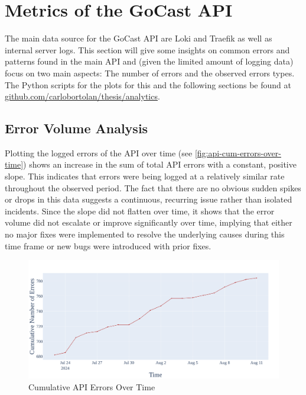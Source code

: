 \section{Metrics of the GoCast API}

The main data source for the GoCast \ac{API} are Loki and Traefik as well as internal server logs. This section will give some insights on common errors and patterns found in the main \ac{API} and (given the limited amount of logging data) focus on two main aspects: The number of errors and the observed errors types. The Python scripts for the plots for this and the following sections be found at \href{https://github.com/carlobortolan/thesis/tree/analytics}{github.com/carlobortolan/thesis/analytics}.

\subsection{Error Volume Analysis}

Plotting the logged errors of the \ac{API} over time (see \autoref{fig:api-cum-errors-over-time}) shows an increase in the sum of total \ac{API} errors with a constant, positive slope. This indicates that errors were being logged at a relatively similar rate throughout the observed period. The fact that there are no obvious sudden spikes or drops in this data suggests a continuous, recurring issue rather than isolated incidents. Since the slope did not flatten over time, it shows that the error volume did not escalate or improve significantly over time, implying that either no major fixes were implemented to resolve the underlying causes during this time frame or new bugs were introduced with prior fixes.

\begin{figure}[htpb]
    \centering
    \includegraphics[width=\linewidth]{images/plots/api/cum_errors_over_time.png}
    \caption[Cumulative \ac{API} Errors Over Time]{Cumulative \ac{API} Errors Over Time}\label{fig:api-cum-errors-over-time}
\end{figure}

